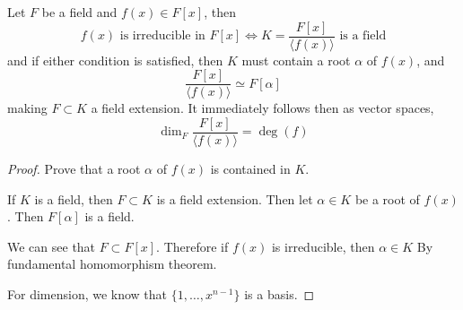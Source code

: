   \begin{theorem}
    Let $F$ be a field and $f(x) \in F[x]$, then 
    \begin{equation}
      f(x) \text{ is irreducible in } F[x] \iff K = \frac{F[x]}{\langle f(x) \rangle} \text{ is a field}
    \end{equation} 
    and if either condition is satisfied, then $K$ must contain a root $\alpha$ of $f(x)$, and 
    \begin{equation}
      \frac{F[x]}{\langle f(x) \rangle} \simeq F[\alpha]
    \end{equation}
    making $F \subset K$ a field extension. It immediately follows then as vector spaces, 
    \begin{equation}
      \dim_F \frac{F[x]}{\langle f(x) \rangle} = \deg(f)
    \end{equation}
  \end{theorem}
  \begin{proof} 
    Prove that a root $\alpha$ of $f(x)$ is contained in $K$. 

    If $K$ is a field, then $F \subset K$ is a field extension. Then let $\alpha \in K$ be a root of $f(x)$. Then $F[\alpha]$ is a field.  

    We can see that $F \subset F[x]$. Therefore if $f(x)$ is irreducible, then $\alpha \in K$
    By fundamental homomorphism theorem. 

    For dimension, we know that $\{1, \ldots, x^{n-1}\}$ is a basis. 
  \end{proof}

